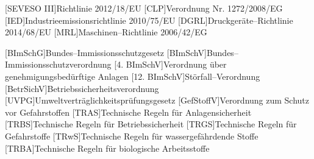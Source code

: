 \begin{acronym}[12. BImSchV]
	[SEVESO III]{Richtlinie 2012/18/EU}
	[CLP]{Verordnung Nr. 1272/2008/EG}
	[IED]{Industrieemissionsrichtlinie 2010/75/EU}
	[DGRL]{Druckger\"ate--Richtlinie 2014/68/EU}
	[MRL]{Maschinen--Richtlinie 2006/42/EG}
	
	[BImSchG]{Bundes--Immissionsschutzgesetz}
	[BImSchV]{Bundes--Immissionsschutzverordnung}
  [4. BImSchV]{Verordnung \"uber genehmigungsbed\"urftige Anlagen}
	[12. BImSchV]{St\"orfall--Verordnung}
	[BetrSichV]{Betriebssicherheitsverordnung}
	[UVPG]{Umweltvertr\"aglichkeitspr\"ufungsgesetz}
	[GefStoffV]{Verordnung zum Schutz vor Gefahrstoffen}
	[TRAS]{Technische Regeln f\"ur Anlagensicherheit}
	[TRBS]{Technische Regeln f\"ur Betriebssicherheit}
	[TRGS]{Technische Regeln f\"ur Gefahrstoffe}
	[TRwS]{Technische Regeln f\"ur wassergef\"ahrdende Stoffe}
	[TRBA]{Technische Regeln f\"ur biologische Arbeitsstoffe}
\end{acronym}